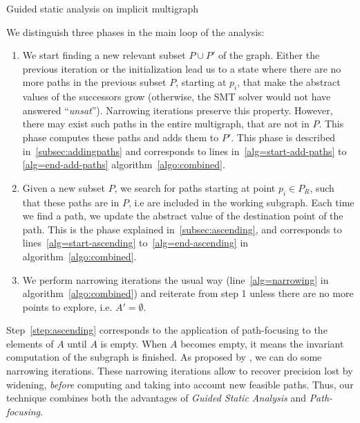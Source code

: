 \documentclass[preprint]{sigplanconf}
\newcommand{\MM}[1]{{\color{blue} TODO(MM): #1}}
\begin{document}
\begin{algorithm}
	\caption{Guided static analysis on implicit multigraph}
	\label{algo:combined}
	\begin{algorithmic}[1] 
	
	\end{algorithmic}
\end{algorithm}


We distinguish three phases in the main loop of the analysis:
\begin{enumerate}
\item \label{step:addingpaths} We start finding a new relevant subset
  $P \cup P'$ of the graph.
  Either the previous iteration or the initialization lead us to a
  state where there are no more paths in the previous subset $P$,
  starting at $p_i$, that make the abstract values of the successors
  grow (otherwise, the SMT solver would not have answered
  ``\emph{unsat}''). Narrowing iterations preserve this property.
  However, there may exist such paths in the entire multigraph, that
  are not in $P$. This phase computes these paths and adds them to
  $P'$. This phase is described in~\ref{subsec:addingpaths}
  and corresponds to lines in~\ref{alg=start-add-paths} to
  \ref{alg=end-add-paths} algorithm~\ref{algo:combined}.
\item \label{step:ascending} Given a new subset $P$, we search for paths starting at point
  $p_i \in P_R$, such that these paths are in $P$, i.e are included in
  the working subgraph. Each time we find a path, we update the
  abstract value of the destination point of the path. This is the
  phase explained in~\ref{subsec:ascending}, and corresponds to
  lines~\ref{alg=start-ascending} to~\ref{alg=end-ascending} in
  algorithm~\ref{algo:combined}.
\item  \label{step:narrowing} We perform narrowing iterations the usual way
  (line~\ref{alg=narrowing} in algorithm~\ref{algo:combined}) and
  reiterate from step 1 unless there are no more points to explore,
  i.e. $A' = \emptyset$.
\end{enumerate}

%
%

Step~\ref{step:ascending} corresponds to the application of
path-focusing \cite{Monniaux_Gonnord_SAS11} to
the elements of $A$ until $A$ is empty. 
When $A$ becomes empty, it means the
invariant computation of the subgraph is finished. As proposed by
\citet{DBLP:conf/sas/GopanR07}, we can do some narrowing iterations.
These narrowing iterations allow to recover precision lost by
widening, \emph{before} computing and taking into account new feasible paths.
Thus, our technique combines both the advantages of \emph{Guided Static
Analysis} and \emph{Path-focusing}.
\end{document}
